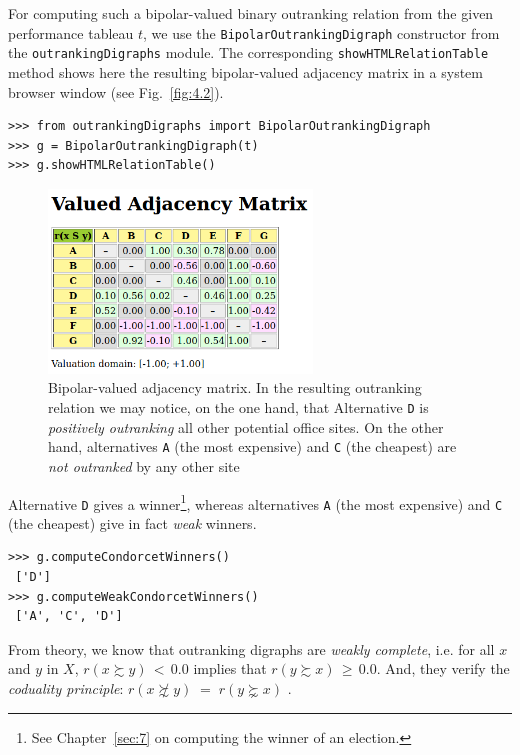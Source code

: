 For computing such a bipolar-valued binary outranking relation from the given performance tableau $t$, we use the \texttt{BipolarOutrankingDigraph} constructor from the \texttt{outrankingDigraphs} module. The corresponding
\texttt{showHTMLRe\-lationTable} method shows here the resulting bipolar-valued adjacency matrix in a system browser window (see Fig.~\vref{fig:4.2}).
\begin{lstlisting}[caption={Computing a bipolar-valued outranking digraph},label=list:4.3]
>>> from outrankingDigraphs import BipolarOutrankingDigraph
>>> g = BipolarOutrankingDigraph(t)
>>> g.showHTMLRelationTable()
\end{lstlisting}
\begin{figure}[h]
\sidecaption[t]
\includegraphics[width=7cm]{Figures/4-2-officeChoiceOutranking.png}
\caption{Bipolar-valued adjacency matrix. In the resulting outranking relation we may notice, on the one hand, that Alternative \texttt{D} is \emph{positively outranking} all other potential office sites. On the other hand, alternatives \texttt{A} (the most expensive) and \texttt{C} (the cheapest) are \emph{not outranked} by any other site}
\label{fig:4.2}       %
\end{figure}
Alternative \texttt{D} gives a \Condorcet winner\footnote{See Chapter~\vref{sec:7} on computing the winner of an election.}, whereas alternatives \texttt{A} (the most expensive) and \texttt{C} (the cheapest) give in fact \emph{weak} \Condorcet winners.
\begin{lstlisting}
>>> g.computeCondorcetWinners()
 ['D']
>>> g.computeWeakCondorcetWinners()
 ['A', 'C', 'D']
\end{lstlisting}

From theory, we know that outranking digraphs are \emph{weakly complete}, i.e. for all $x$ and $y$ in $X$, $r(x \succsim y)\, <\, 0.0$ implies that $r(y \succsim x)\, \geq\, 0.0$. And, they verify the \emph{coduality principle}:  $r(x \not\succsim y) \;=\; r(y \succnsim x)$ \citep{BIS-2013}.

